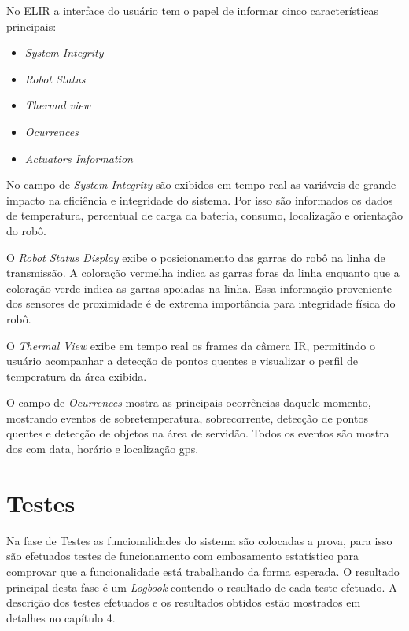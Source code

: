 	No ELIR a interface do usuário tem o papel de informar cinco características principais:
	
	\begin{itemize}
		\item \textit{System Integrity}
		\item \textit{Robot Status}
		\item \textit{Thermal view}
		\item \textit{Ocurrences}
		\item \textit{Actuators Information}
	\end{itemize}
	
	No campo de \textit{System Integrity} são exibidos em tempo real as variáveis de grande impacto na eficiência e integridade do sistema. Por isso são informados os dados de temperatura, percentual de carga da bateria, consumo, localização e orientação do robô.
	
	O \textit{Robot Status Display} exibe o posicionamento das garras do robô na linha de transmissão. A coloração vermelha indica as garras foras da linha enquanto que a coloração verde indica as garras apoiadas na linha. Essa informação proveniente dos sensores de proximidade é de extrema importância para integridade física do robô.
	
	O \textit{Thermal View} exibe em  tempo real os frames da câmera IR, permitindo o usuário acompanhar a detecção de pontos quentes e visualizar o perfil de temperatura da área exibida. 
	
	O campo de \textit{Ocurrences} mostra as principais ocorrências daquele momento, mostrando eventos de sobretemperatura, sobrecorrente, detecção de pontos quentes e detecção de objetos na área de servidão. Todos os eventos são mostra
	dos com data, horário e localização gps. 
	
	
	\section{Testes}
	Na fase de Testes as funcionalidades do sistema são colocadas a prova, para isso são efetuados testes de funcionamento com embasamento estatístico para comprovar que a funcionalidade está trabalhando da forma esperada. O resultado principal desta fase é um \textit{Logbook} contendo o resultado de cada teste efetuado. A descrição dos testes efetuados e os resultados obtidos estão mostrados em detalhes no capítulo 4.
	
	
